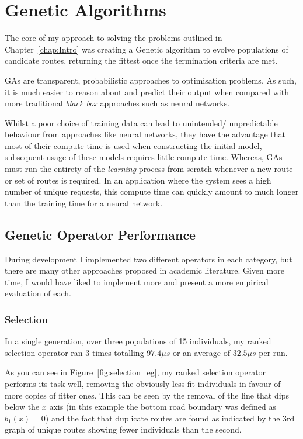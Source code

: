 \section{Genetic Algorithms}

The core of my approach to solving the problems outlined in Chapter~\ref{chap:Intro} was creating a Genetic algorithm to evolve populations of candidate routes, returning the fittest once the termination criteria are met.

GAs are transparent, probabilistic approaches to optimisation problems. As such, it is much easier to reason about and predict their output when compared with more traditional \textit{black box} approaches such as neural networks.

Whilst a poor choice of training data can lead to unintended/ unpredictable behaviour from approaches like neural networks, they have the advantage that most of their compute time is used when constructing the initial model, subsequent usage of these models requires little compute time. Whereas, GAs must run the entirety of the \textit{learning} process from scratch whenever a new route or set of routes is required. In an application where the system sees a high number of unique requests, this compute time can quickly amount to much longer than the training time for a neural network.

\subsection{Genetic Operator Performance}

During development I implemented two different operators in each category, but there are many other approaches proposed in academic literature. Given more time, I would have liked to implement more and present a more empirical evaluation of each.

\subsubsection{Selection}

In a single generation, over three populations of 15 individuals, my ranked selection operator ran 3 times totalling $97.4\mu s$ or an average of $32.5\mu s$ per run.

As you can see in Figure~\ref{fig:selection_eg}, my ranked selection operator performs its task well, removing the obviously less fit individuals in favour of more copies of  fitter ones. This can be seen by the removal of the line that dips below the $x$ axis (in this example the bottom road boundary was defined as $b_{1}(x) = 0 $) and the fact that duplicate routes are found as indicated by the 3rd graph of unique routes showing fewer individuals than the second.


